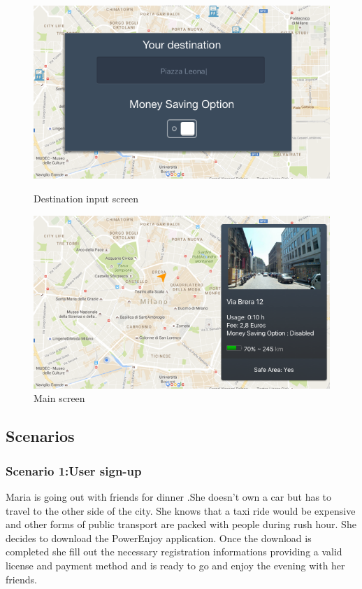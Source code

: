 \documentclass[12pt]{article}
\begin{document}
 	 	\begin{figure}
		 \centering	
		\includegraphics[scale=0.6]{Images/onBoard/Destination.png}
		 \caption{Destination input screen}
		\centering
 	 	\includegraphics[scale=0.6]{Images/onBoard/Main.png}
		  \caption{Main screen}
 	 	\end{figure}
 	 	\clearpage
 	 	
 	 	
 	 	\newpage
 	 	\subsection{Scenarios}
 	 	
 	 	\subsubsection{Scenario 1:User sign-up}
 	 	Maria is going out with friends for dinner .She doesn't own a 
 	 	car but has to travel to the other side of the city. She knows that a taxi ride  
 	 	would be expensive and other forms of public transport are packed with people during
 	 	rush hour. She decides to download the PowerEnjoy application. Once the download is 
 	 	completed she fill out the necessary registration informations providing a valid 
 	 	license and payment method and is ready to go and enjoy the evening with her friends.
\end{document}
